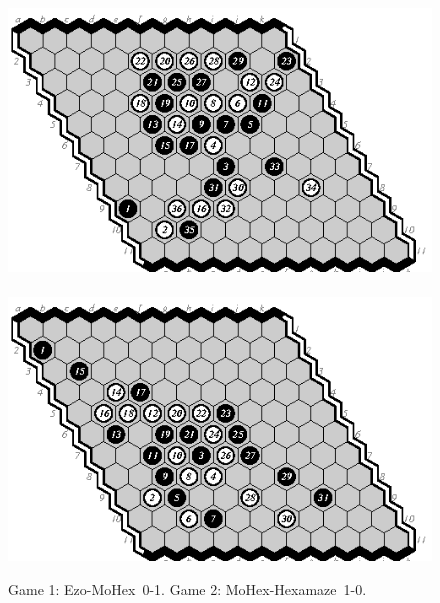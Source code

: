 \documentclass{icga}
\def\Eo{\mbox{\sc Ezo}}
\def\Hz{\mbox{\sc Hexamaze}}
\def\Mx{\mbox{\sc MoHex}}
\begin{document}
\begin{figure}[hbp]
\includegraphics[scale=1.3]{games/pix/01-em-0-1.eps}\hspace*{-1cm}\
\includegraphics[scale=1.3]{games/pix/02-mh-1-0.eps}
\caption{Game 1: \Eo-\Mx\ 0-1. Game 2: \Mx-\Hz\ 1-0.}
\end{figure}
\end{document}
